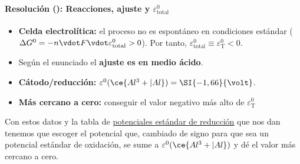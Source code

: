 \begin{frame}
	\frametitle{\ejerciciocmd}
	\framesubtitle{Resolución (): Reacciones, ajuste y $\varepsilon^0_{\text{total}}$}
	\begin{overprint}
			\begin{itemize}
				\item\textbf{Celda electrolítica:} el proceso no es espontáneo en condiciones estándar ($\Delta G^0 = - n\vdot F\vdot\varepsilon^0_{\text{total}} > 0$). Por tanto, $\varepsilon^0_{\text{total}}\equiv\varepsilon^0_{\text{T}} < 0$.
				\item Según el enunciado el \textbf{ajuste es en medio ácido}.
				\item\textbf{Cátodo/reducción:} $\varepsilon^0(\ce{Al^3+|Al}) = \SI{-1,66}{\volt}$.
				\item\textbf{Más cercano a cero:} conseguir el valor negativo más alto de $\varepsilon^0_\text{T}$
			\end{itemize}
			Con estos datos y la tabla de \underline{potenciales estándar de reducción} que nos dan tenemos que escoger el potencial que, cambiado de signo para que sea un potencial estándar de oxidación, se sume a $\varepsilon^0(\ce{Al^3+|Al})$ y dé el valor más cercano a cero.


\end{overprint}
\end{frame}
